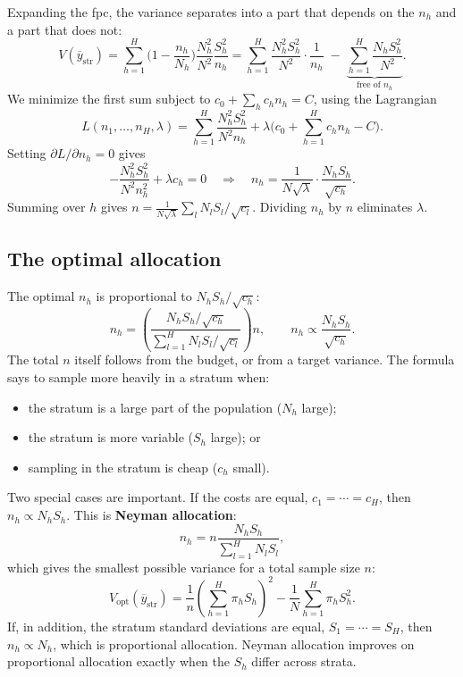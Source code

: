 \documentclass[
  letterpaper,
  DIV=11,
  numbers=noendperiod]{scrreprt}
\providecommand{\tightlist}{%
  \setlength{\itemsep}{0pt}\setlength{\parskip}{0pt}}
\renewcommand{\[}{\begin{equation}}
\renewcommand{\]}{\end{equation}}
\begin{document}
Expanding the fpc, the variance separates into a part that depends on
the \(n_h\) and a part that does not: \[
V(\overline y_{\text{str}}) = \sum_{h=1}^H \Big(1-\frac{n_h}{N_h}\Big)\frac{N_h^2}{N^2}\frac{S_h^2}{n_h}
 = \sum_{h=1}^H \frac{N_h^2S_h^2}{N^2}\cdot\frac1{n_h} \;-\; \underbrace{\sum_{h=1}^H \frac{N_hS_h^2}{N^2}}_{\text{free of } n_h}.
\] We minimize the first sum subject to \(c_0+\sum_h c_hn_h = C\), using
the Lagrangian \[
L(n_1,\ldots,n_H,\lambda) = \sum_{h=1}^H \frac{N_h^2S_h^2}{N^2 n_h} + \lambda\Big(c_0+\sum_{h=1}^H c_hn_h - C\Big).
\] Setting \(\partial L/\partial n_h = 0\) gives \[
-\frac{N_h^2S_h^2}{N^2n_h^2} + \lambda c_h = 0
\quad\Longrightarrow\quad
n_h = \frac{1}{N\sqrt\lambda}\cdot\frac{N_hS_h}{\sqrt{c_h}} .
\] Summing over \(h\) gives
\(n = \frac{1}{N\sqrt\lambda}\sum_{l} N_lS_l/\sqrt{c_l}\). Dividing
\(n_h\) by \(n\) eliminates \(\lambda\).

\subsection{The optimal allocation}\label{the-optimal-allocation}

The optimal \(n_h\) is proportional to \(N_hS_h/\sqrt{c_h}\): \[
\boxed{
n_h = \left(\frac{N_hS_h/\sqrt{c_h}}{\sum_{l=1}^H N_lS_l/\sqrt{c_l}}\right)n,
\qquad n_h \propto \frac{N_hS_h}{\sqrt{c_h}} .}
\] The total \(n\) itself follows from the budget, or from a target
variance. The formula says to sample more heavily in a stratum when:

\begin{itemize}
\tightlist
\item
  the stratum is a large part of the population (\(N_h\) large);
\item
  the stratum is more variable (\(S_h\) large); or
\item
  sampling in the stratum is cheap (\(c_h\) small).
\end{itemize}

Two special cases are important. If the costs are equal,
\(c_1=\cdots=c_H\), then \(n_h\propto N_hS_h\). This is \textbf{Neyman
allocation}: \[
\boxed{n_h = n \frac{N_h S_h}{\sum_{l=1}^H N_l S_l}},
\] which gives the smallest possible variance for a total sample size
\(n\): \[
\boxed{V_{\text{opt}}(\overline{y}_{\text{str}}) = \frac{1}{n}\left(\sum_{h=1}^H \pi_h S_h\right)^2 - \frac{1}{N}\sum_{h=1}^H \pi_h S_h^2}.
\] If, in addition, the stratum standard deviations are equal,
\(S_1=\cdots=S_H\), then \(n_h\propto N_h\), which is proportional
allocation. Neyman allocation improves on proportional allocation
exactly when the \(S_h\) differ across strata.
\end{document}
